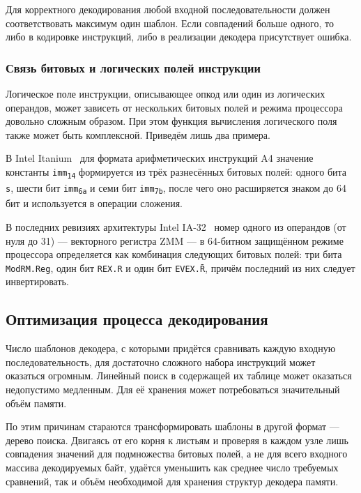 Для корректного декодирования любой входной последовательности должен соответствовать максимум один шаблон. Если совпадений больше одного, то либо в кодировке инструкций, либо в реализации декодера присутствует ошибка. %

\subsubsection{Связь битовых и логических полей инструкции}

Логическое поле инструкции, описывающее опкод или один из логических операндов, может зависеть от нескольких битовых полей и режима процессора довольно сложным образом. При этом функция вычисления логического поля также может быть комплексной. Приведём лишь два примера.

\begin{enumerate*}
    \item В Intel Itanium~\cite{itanium-sdm} для формата арифметических инструкций A4 значение константы \texttt{imm\textsubscript{14}} формируется из трёх разнесённых битовых полей: одного бита \texttt{s}, шести бит \texttt{imm\textsubscript{6a}} и семи бит \texttt{imm\textsubscript{7b}}, после чего оно расширяется знаком до 64 бит и используется в операции сложения.
    
    \item В последних ревизиях архитектуры Intel IA-32~\cite{intel-x-reference} номер одного из операндов (от нуля до 31) ---   векторного регистра ZMM --- в 64-битном защищённом режиме процессора определяется как комбинация следующих битовых полей: три бита \texttt{ModRM.Reg}, один бит \texttt{REX.R} и один бит \texttt{EVEX.\={R}}, причём последний из них следует инвертировать.
\end{enumerate*}

\subsection{Оптимизация процесса декодирования}

Число шаблонов декодера, с которыми придётся сравнивать каждую входную последовательность, для достаточно сложного набора инструкций может оказаться огромным. Линейный поиск в содержащей их таблице может оказаться недопустимо медленным. Для её хранения может потребоваться значительный объём памяти.

По этим причинам стараются трансформировать шаблоны в другой формат --- дерево поиска. Двигаясь от его корня к листьям и проверяя в каждом узле лишь совпадения значений для подмножества битовых полей, а не для всего входного массива декодируемых байт, удаётся уменьшить как среднее число требуемых сравнений, так и объём необходимой для хранения структур декодера памяти.

